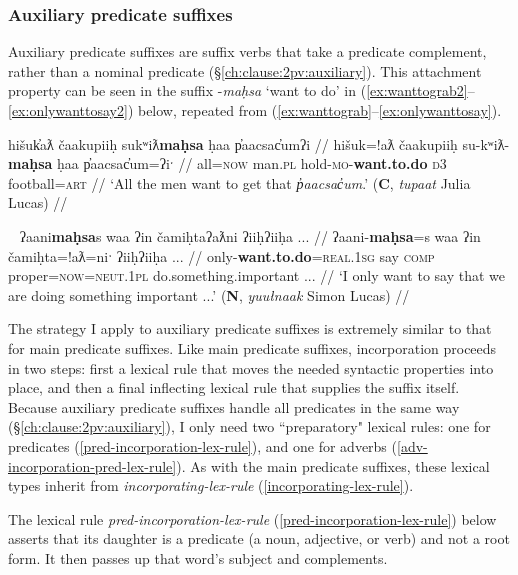 \subsubsection{Auxiliary predicate suffixes} \label{ch:clause:analysis:auxpred}

Auxiliary predicate suffixes are suffix verbs that take a predicate complement, rather than a nominal predicate (\S\ref{ch:clause:2pv:auxiliary}). This attachment property can be seen in the suffix -\textit{maḥsa} `want to do' in (\ref{ex:wanttograb2}--\ref{ex:onlywanttosay2}) below, repeated from (\ref{ex:wanttograb}--\ref{ex:onlywanttosay}).

\ex \label{ex:wanttograb2}
\begingl
\glpreamble hišuk̓aƛ čaakupiiḥ sukʷiƛ\textbf{maḥsa} ḥaa p̓aacsac̓umʔi //
\gla hišuk=!aƛ čaakupiiḥ su-kʷiƛ-\textbf{maḥsa} ḥaa p̓aacsac̓um=ʔiˑ //
\glb all=\textsc{now} man.\textsc{pl} hold-\textsc{mo}-\textbf{want.to.do} \textsc{d3} football\footnotemark=\textsc{art} //
\glft `All the men want to get that \textit{p̓aacsac̓um}.' (\textbf{C}, \textit{tupaat} Julia Lucas) //
\endgl
\xe

\ex~ \label{ex:onlywanttosay2}
\begingl
\glpreamble ʔaani\textbf{maḥsa}s waa ʔin čamiḥtaʔaƛni ʔiiḥʔiiḥa ... //
\gla ʔaani-\textbf{maḥsa}=s waa ʔin čamiḥta=!aƛ=niˑ ʔiiḥʔiiḥa ... //
\glb only-\textbf{want.to.do}=\textsc{real.1sg} say \textsc{comp} proper=\textsc{now}=\textsc{neut.1pl} do.something.important ... //
\glft `I only want to say that we are doing something important ...' (\textbf{N}, \textit{yuułnaak} Simon Lucas) //
\endgl
\xe

The strategy I apply to auxiliary predicate suffixes is extremely similar to that for main predicate suffixes. Like main predicate suffixes, incorporation proceeds in two steps: first a lexical rule that moves the needed syntactic properties into place, and then a final inflecting lexical rule that supplies the suffix itself. Because auxiliary predicate suffixes handle all predicates in the same way (\S\ref{ch:clause:2pv:auxiliary}), I only need two ``preparatory" lexical rules: one for predicates (\ref{pred-incorporation-lex-rule}), and one for adverbs (\ref{adv-incorporation-pred-lex-rule}). As with the main predicate suffixes, these lexical types inherit from {\textit{incorporating-lex-rule}} (\ref{incorporating-lex-rule}).

The lexical rule \textit{pred-incorporation-lex-rule} (\ref{pred-incorporation-lex-rule}) below asserts that its daughter is a predicate (a noun, adjective, or verb) and not a root form. It then passes up that word's subject and complements.

